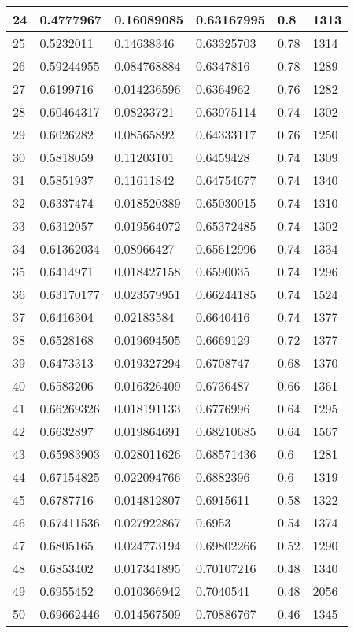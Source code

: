 \begin{longtable}{|l|l|l|l|l|l|}
24 & 0.4777967 & 0.16089085 & 0.63167995 & 0.8 & 1313 \\ \hline 
25 & 0.5232011 & 0.14638346 & 0.63325703 & 0.78 & 1314 \\ \hline 
26 & 0.59244955 & 0.084768884 & 0.6347816 & 0.78 & 1289 \\ \hline 
27 & 0.6199716 & 0.014236596 & 0.6364962 & 0.76 & 1282 \\ \hline 
28 & 0.60464317 & 0.08233721 & 0.63975114 & 0.74 & 1302 \\ \hline 
29 & 0.6026282 & 0.08565892 & 0.64333117 & 0.76 & 1250 \\ \hline 
30 & 0.5818059 & 0.11203101 & 0.6459428 & 0.74 & 1309 \\ \hline 
31 & 0.5851937 & 0.11611842 & 0.64754677 & 0.74 & 1340 \\ \hline 
32 & 0.6337474 & 0.018520389 & 0.65030015 & 0.74 & 1310 \\ \hline 
33 & 0.6312057 & 0.019564072 & 0.65372485 & 0.74 & 1302 \\ \hline 
34 & 0.61362034 & 0.08966427 & 0.65612996 & 0.74 & 1334 \\ \hline 
35 & 0.6414971 & 0.018427158 & 0.6590035 & 0.74 & 1296 \\ \hline 
36 & 0.63170177 & 0.023579951 & 0.66244185 & 0.74 & 1524 \\ \hline 
37 & 0.6416304 & 0.02183584 & 0.6640416 & 0.74 & 1377 \\ \hline 
38 & 0.6528168 & 0.019694505 & 0.6669129 & 0.72 & 1377 \\ \hline 
39 & 0.6473313 & 0.019327294 & 0.6708747 & 0.68 & 1370 \\ \hline 
40 & 0.6583206 & 0.016326409 & 0.6736487 & 0.66 & 1361 \\ \hline 
41 & 0.66269326 & 0.018191133 & 0.6776996 & 0.64 & 1295 \\ \hline 
42 & 0.6632897 & 0.019864691 & 0.68210685 & 0.64 & 1567 \\ \hline 
43 & 0.65983903 & 0.028011626 & 0.68571436 & 0.6 & 1281 \\ \hline 
44 & 0.67154825 & 0.022094766 & 0.6882396 & 0.6 & 1319 \\ \hline 
45 & 0.6787716 & 0.014812807 & 0.6915611 & 0.58 & 1322 \\ \hline 
46 & 0.67411536 & 0.027922867 & 0.6953 & 0.54 & 1374 \\ \hline 
47 & 0.6805165 & 0.024773194 & 0.69802266 & 0.52 & 1290 \\ \hline 
48 & 0.6853402 & 0.017341895 & 0.70107216 & 0.48 & 1340 \\ \hline 
49 & 0.6955452 & 0.010366942 & 0.7040541 & 0.48 & 2056 \\ \hline 
50 & 0.69662446 & 0.014567509 & 0.70886767 & 0.46 & 1345 \\ \hline 
\end{longtable}